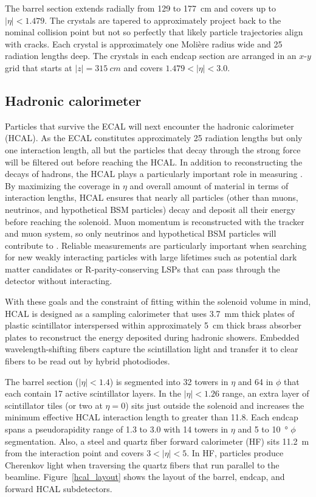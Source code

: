 

The barrel section extends radially from \num{129} to \SI{177}{cm} and covers up to $|\eta|<1.479$. The crystals are tapered to approximately project back to the nominal collision point but not so perfectly that likely particle trajectories align with cracks. Each crystal is approximately one Moli\`ere radius wide and 25 radiation lengths deep. The crystals in each endcap section are arranged in an $x$-$y$ grid that starts at $|z|=\SI{315}{cm}$ and covers $1.479<|\eta|<3.0$.

\subsection{Hadronic calorimeter}
Particles that survive the ECAL will next encounter the hadronic calorimeter (HCAL). As the ECAL constitutes approximately 25 radiation lengths but only one interaction length, all but the particles that decay through the strong force will be filtered out before reaching the HCAL. In addition to reconstructing the decays of hadrons, the HCAL plays a particularly important role in measuring \ptmiss. By maximizing the coverage in $\eta$ and overall amount of material in terms of interaction lengths, HCAL ensures that nearly all particles (other than muons, neutrinos, and hypothetical BSM particles) decay and deposit all their energy before reaching the solenoid. Muon momentum is reconstructed with the tracker and muon system, so only neutrinos and hypothetical BSM particles will contribute to \ptmiss. Reliable \ptmiss measurements are particularly important when searching for new weakly interacting particles with large lifetimes such as potential dark matter candidates or R-parity-conserving LSPs that can pass through the detector without interacting.

With these goals and the constraint of fitting within the solenoid volume in mind, HCAL is designed as a sampling calorimeter that uses \SI{3.7}{\milli\metre} thick plates of plastic scintillator interspersed within approximately \SI{5}{\cm} thick brass absorber plates to reconstruct the energy deposited during hadronic showers. Embedded wavelength-shifting fibers capture the scintillation light and transfer it to clear fibers to be read out by hybrid photodiodes.

The barrel section ($|\eta|<1.4$) is segmented into \num{32} towers in $\eta$ and \num{64} in $\phi$ that each contain 17 active scintillator layers. In the $|\eta|<1.26$ range, an extra layer of scintillator tiles (or two at $\eta=0$) sits just outside the solenoid and increases the minimum effective HCAL interaction length to greater than \num{11.8}. Each endcap spans a pseudorapidity range of \num{1.3} to \num{3.0} with \num{14} towers in $\eta$ and \num{5} to \SI{10}{\degree} $\phi$ segmentation. Also, a steel and quartz fiber forward calorimeter (HF) sits \SI{11.2}{m} from the interaction point and covers $3<|\eta|<5$. In HF, particles produce Cherenkov light when traversing the quartz fibers that run parallel to the beamline. Figure~\ref{hcal_layout} shows the layout of the barrel, endcap, and forward HCAL subdetectors.

